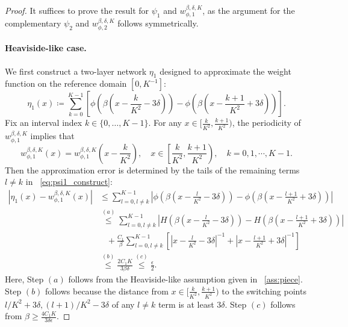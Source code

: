 \documentclass[11pt]{article}
\begin{document}
\begin{proof}
    It suffices to prove the result for $\psi_1$ and $w_{\phi,1}^{\beta, \delta, K}$, as the argument for the complementary $\psi_2$ and $w_{\phi,2}^{\beta, \delta, K}$ follows symmetrically.

    \noindent
    \paragraph{Heaviside-like case.} We first construct a two-layer network $\eta_1$ designed to approximate the weight function on the reference domain $[0, K^{-1}]$:
    \begin{equation}
        \eta_1 (x) \coloneqq  \sum_{k=0}^{K-1} \left[ \phi\left( \beta \left( x - \frac{k}{K^2} - 3 \delta\right)\right) - \phi\left( \beta \left( x - \frac{k+1}{K^2} + 3 \delta\right)\right)\right].
        \label{eq:psi1_construct}
    \end{equation}
    Fix an interval index $k \in \{0, \dots, K-1\}$. For any $x \in [\frac{k}{K^2}, \frac{k+1}{K^2})$, the periodicity of $w_{\phi,1}^{\beta, \delta, K}$ implies that 
    \begin{equation*}
        w_{\phi,1}^{\beta, \delta, K}(x) = w_{\phi,1}^{\beta, \delta, K} \left(x - \frac{k}{K^2} \right), \quad x\in \left[ \frac{k}{K^2}, \frac{k+1}{K^2}\right), \quad k = 0,1, \cdots, K-1.
    \end{equation*}
    Then the approximation error is determined by the tails of the remaining terms $l \neq k$  in ~\eqref{eq:psi1_construct}:
    \begin{equation}
        \begin{aligned}
            |\eta_1 (x) - w_{\phi,1}^{\beta, \delta, K}(x)| &\leq \sum_{l=0, l\neq k}^{K-1} \left|\phi\left( \beta \left( x - \frac{l}{K^2} - 3 \delta\right)\right) - \phi\left( \beta \left( x - \frac{l+1}{K^2} + 3 \delta\right)\right)\right| \\
            & \overset{(a)}{\leq } \sum_{l=0, l\neq k}^{K-1} \left|H\left( \beta \left( x - \frac{l}{K^2} - 3 \delta\right)\right) - H\left( \beta \left( x - \frac{l+1}{K^2} + 3 \delta\right)\right)\right|  \\
            & \; \; \;+ \frac{C_1}{\beta} \sum_{l=0, l\neq k}^{K-1} \left[ \left|x - \frac{l}{K^2}-3 \delta \right|^{-1} + \left|x - \frac{l+1}{K^2}+ 3 \delta \right|^{-1}\right] \\
            & \overset{(b)}{\leq } \frac{2C_1 K}{3 \beta \delta} \overset{(c)}{\leq } \frac{\epsilon}{2}.
        \end{aligned}
        \label{eq:two-layer-app-Heaviside}
    \end{equation}
    Here, Step $(a)$ follows from the Heaviside-like assumption given in ~\eqref{ass:piece}. Step $(b)$ follows because the distance from $x \in [\frac{k}{K^2}, \frac{k+1}{K^2})$ to the switching points $l/K^2+3\delta, (l+1)/K^2-3\delta$ of any $l \neq k$ term is at least $3\delta$. Step $(c)$ follows from $\beta \geq \frac{4C_1 K}{3 \delta \epsilon}$.



\end{proof}
\end{document}
